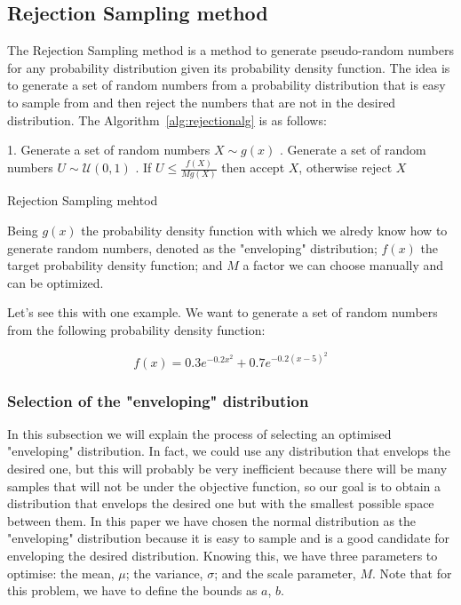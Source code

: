\documentclass{article}
\begin{document}
\subsection{Rejection Sampling method}
\label{sec:rejection_sampling}

The Rejection Sampling method is a method to generate pseudo-random numbers for any probability distribution given its probability density function. The idea is to generate a set of random numbers from a probability distribution that is easy to sample from and then reject the numbers that are not in the desired distribution. The Algorithm~\ref{alg:rejectionalg} is as follows:

\begin{center}
	\begin{minipage}{0.7\linewidth} %
		\begin{algorithm}[H]
			1. Generate a set of random numbers \(X \sim g(x)\) . Generate a set of random numbers \(U \sim \mathcal{U}(0,1)\) . If \(U \leq \frac{f(X)}{Mg(X)}\) then accept \(X\), otherwise reject \(X\) \;
			\caption{Rejection Sampling mehtod} %
			\label{alg:rejectionalg}   %
		\end{algorithm}
	\end{minipage}
\end{center}

Being \(g(x)\) the probability density function with which we alredy know how to generate random numbers, denoted as the "enveloping" distribution; \(f(x)\) the target probability density function; and \(M\) a factor we can choose manually and can be optimized.

Let's see this with one example. We want to generate a set of random numbers from the following probability density function: 

\begin{equation} \label{eq:bimodal} f(x) = 0.3e^{-0.2x^2}+0.7e^{-0.2(x-5)^2} \end{equation}

\subsubsection{Selection of the "enveloping" distribution}
\label{sec:enveloping_distribution}

In this subsection we will explain the process of selecting an optimised "enveloping" distribution. In fact, we could use any distribution that envelops the desired one, but this will probably be very inefficient because there will be many samples that will not be under the objective function, so our goal is to obtain a distribution that envelops the desired one but with the smallest possible space between them. In this paper we have chosen the normal distribution as the "enveloping" distribution because it is easy to sample and is a good candidate for enveloping the desired distribution. Knowing this, we have three parameters to optimise: the mean, \(\mu\); the variance, \(\sigma\); and the scale parameter, \(M\). Note that for this problem, we have to define the bounds as \(a\), \(b\).
\end{document}
